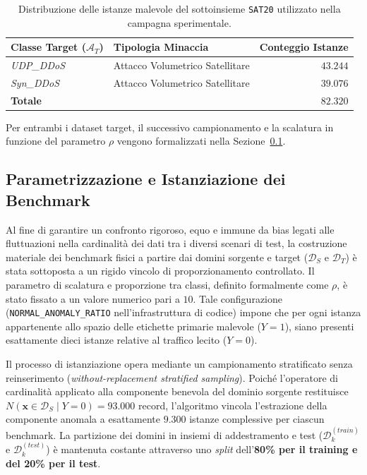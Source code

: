 \begin{table}[H]
    \centering
    \small
    \caption{Distribuzione delle istanze malevole del sottoinsieme \texttt{SAT20} utilizzato nella campagna sperimentale.}
    \label{tab:sat20_distribution}
    \begin{tabular}{llr}
        \toprule
        \textbf{Classe Target ($\mathcal{A}_T$)} & \textbf{Tipologia Minaccia} & \textbf{Conteggio Istanze} \\
        \midrule
        \textit{UDP\_DDoS} & Attacco Volumetrico Satellitare & $43.244$ \\
        \textit{Syn\_DDoS} & Attacco Volumetrico Satellitare & $39.076$ \\
        \hline
        \textbf{Totale} & & $\mathbf{82.320}$ \\
        \bottomrule
    \end{tabular}
\end{table}

Per entrambi i dataset target, il successivo campionamento e la scalatura in funzione del parametro $\rho$ vengono formalizzati nella Sezione~\ref{subsec:parametrizzazione_benchmark}.

\subsection{Parametrizzazione e Istanziazione dei Benchmark}
\label{subsec:parametrizzazione_benchmark}

Al fine di garantire un confronto rigoroso, equo e immune da bias legati alle fluttuazioni nella cardinalità dei dati tra i diversi scenari di test, la costruzione materiale dei benchmark fisici a partire dai domini sorgente e target ($\mathcal{D}_S$ e $\mathcal{D}_T$) è stata sottoposta a un rigido vincolo di proporzionamento controllato. 
Il parametro di scalatura e proporzione tra classi, definito formalmente come $\rho$, è stato fissato a un valore numerico pari a $10$. Tale configurazione (\texttt{NORMAL\_ANOMALY\_RATIO} nell'infrastruttura di codice) impone che per ogni istanza appartenente allo spazio delle etichette primarie malevole ($Y=1$), siano presenti esattamente dieci istanze relative al traffico lecito ($Y=0$).

Il processo di istanziazione opera mediante un campionamento stratificato senza reinserimento (\textit{without-replacement stratified sampling}). 
Poiché l'operatore di cardinalità applicato alla componente benevola del dominio sorgente restituisce $N(\mathbf{x} \in \mathcal{D}_S \mid Y=0) = 93.000$ record, l'algoritmo vincola l'estrazione della componente anomala a esattamente $9.300$ istanze complessive per ciascun benchmark. 
La partizione dei domini in insiemi di addestramento e test ($\mathcal{D}_k^{(train)}$ e $\mathcal{D}_k^{(test)}$) è mantenuta costante attraverso uno \textit{split} dell'\textbf{80\% per il training e del 20\% per il test}.

